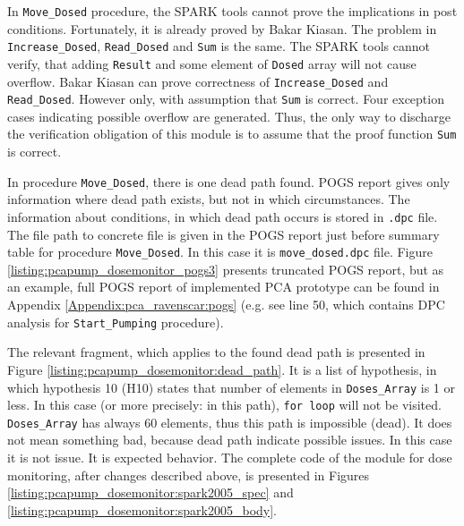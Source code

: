 In \lstinline{Move_Dosed} procedure, the SPARK tools cannot prove the implications in post conditions. Fortunately, it is already proved by Bakar Kiasan. The problem in \lstinline{Increase_Dosed}, \lstinline{Read_Dosed} and \lstinline{Sum} is the same. The SPARK tools cannot verify, that adding \lstinline{Result} and some element of \lstinline{Dosed} array will not cause overflow. Bakar Kiasan can prove correctness of \lstinline{Increase_Dosed} and \lstinline{Read_Dosed}. However only, with assumption that \lstinline{Sum} is correct. Four exception cases indicating possible overflow are generated. Thus, the only way to discharge the verification obligation of this module is to assume that the proof function \lstinline{Sum} is correct.

In procedure \lstinline{Move_Dosed}, there is one dead path found. POGS report gives only information where dead path exists, but not in which circumstances. The information about conditions, in which dead path occurs is stored in \lstinline{.dpc} file. The file path to concrete file is given in the POGS report just before summary table for procedure \lstinline{Move_Dosed}. In this case it is \lstinline{move_dosed.dpc} file. Figure \ref{listing:pcapump_dosemonitor_pogs3} presents truncated POGS report, but as an example, full POGS report of implemented PCA prototype can be found in Appendix \ref{Appendix:pca_ravenscar:pogs} (e.g. see line 50, which contains DPC analysis for \lstinline{Start_Pumping} procedure). 

The relevant fragment, which applies to the found dead path is presented in Figure \ref{listing:pcapump_dosemonitor:dead_path}. It is a list of hypothesis, in which hypothesis 10 (H10) states that number of elements in \lstinline{Doses_Array} is 1 or less. In this case (or more precisely: in this path), \lstinline{for loop} will not be visited. \lstinline{Doses_Array} has always 60 elements, thus this path is impossible (dead). It does not mean something bad, because dead path indicate possible issues. In this case it is not issue. It is expected behavior. The complete code of the module for dose monitoring, after changes described above, is presented in Figures \ref{listing:pcapump_dosemonitor:spark2005_spec} and \ref{listing:pcapump_dosemonitor:spark2005_body}.

